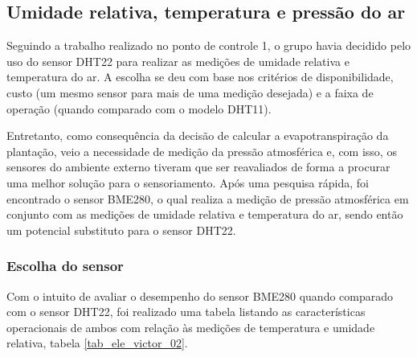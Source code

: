 	\subsection{Umidade relativa, temperatura e pressão do ar}

		Seguindo a trabalho realizado no ponto de controle 1, o grupo havia decidido pelo uso do sensor DHT22 para realizar as medições de umidade relativa e temperatura do ar. A escolha se deu com base nos critérios de disponibilidade, custo (um mesmo sensor para mais de uma medição desejada) e a faixa de operação (quando comparado com o modelo DHT11). 

		Entretanto, como consequência da decisão de calcular a evapotranspiração da plantação, veio a necessidade de medição da pressão atmosférica e, com isso, os sensores do ambiente externo tiveram que ser reavaliados de forma a procurar uma melhor solução para o sensoriamento. Após uma pesquisa rápida, foi encontrado o sensor BME280, o qual realiza a medição de pressão atmosférica em conjunto com as medições de umidade relativa e temperatura do ar, sendo então um potencial substituto para o sensor DHT22.

		\subsubsection{Escolha do sensor}
		Com o intuito de avaliar o desempenho do sensor BME280 quando comparado com o sensor DHT22, foi realizado uma tabela listando as características operacionais de ambos com relação às medições de temperatura e umidade relativa, tabela \ref{tab_ele_victor_02}.

